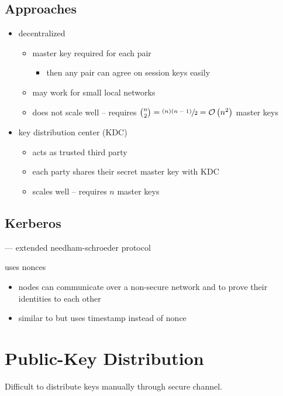 \documentclass[final]{article}
\begin{document}
\subsection{Approaches}
\begin{itemize}[nosep]
    \item decentralized
          \begin{itemize}[nosep]
              \item master key required for each pair
                    \begin{itemize}[nosep]\item then any pair can agree on session keys easily\end{itemize}
              \item may work for small local networks
              \item does not scale well -- requires $\binom{n}{2} = \sfrac{(n)(n-1)}{2} = \mathcal{O}\left(n^2\right)$ master keys
          \end{itemize}
    \item key distribution center (KDC)
          \   \begin{itemize}[nosep]
              \item acts as trusted third party
              \item each party shares their secret master key with KDC
              \item scales well -- requires $n$ master keys
          \end{itemize}
\end{itemize}
\subsection{Kerberos}
 --- \glsdesc{extended needham-schroeder protocol}

uses nonces

\begin{itemize}[nosep]
    \item nodes can communicate over a non-secure network and to prove their identities to each other
    \item similar to  but uses timestamp instead of nonce
\end{itemize}
\section{Public-Key Distribution}
Difficult to distribute keys manually through secure channel.
\end{document}
